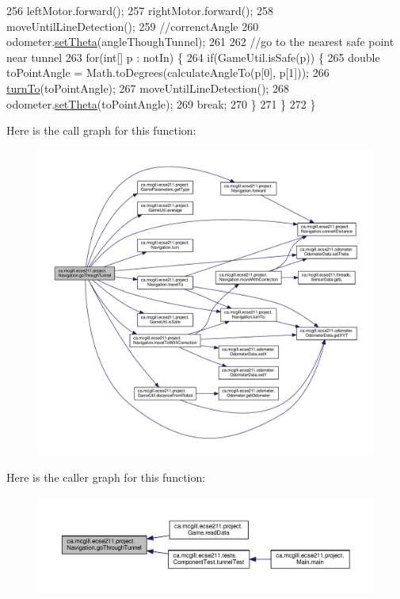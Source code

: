 \begin{DoxyCode}
256     leftMotor.forward();
257     rightMotor.forward();
258     moveUntilLineDetection();
259     \textcolor{comment}{//correnctAngle}
260     odometer.\hyperlink{classca_1_1mcgill_1_1ecse211_1_1odometer_1_1_odometer_data_a419b8f07c2c5374411c8e62298e9a402}{setTheta}(angleThoughTunnel);
261     
262     \textcolor{comment}{//go to the nearest safe point near tunnel}
263     \textcolor{keywordflow}{for}(\textcolor{keywordtype}{int}[] p : notIn) \{
264       \textcolor{keywordflow}{if}(GameUtil.isSafe(p)) \{
265         \textcolor{keywordtype}{double} toPointAngle = Math.toDegrees(calculateAngleTo(p[0], p[1]));
266         \hyperlink{classca_1_1mcgill_1_1ecse211_1_1project_1_1_navigation_a3bbe0645f2b3b3d0986b4a707fb5a00c}{turnTo}(toPointAngle);
267         moveUntilLineDetection();
268         odometer.\hyperlink{classca_1_1mcgill_1_1ecse211_1_1odometer_1_1_odometer_data_a419b8f07c2c5374411c8e62298e9a402}{setTheta}(toPointAngle);
269         \textcolor{keywordflow}{break};
270       \}
271     \}
272   \}
\end{DoxyCode}
Here is the call graph for this function\+:
\nopagebreak
\begin{figure}[H]
\begin{center}
\leavevmode
\includegraphics[width=350pt]{classca_1_1mcgill_1_1ecse211_1_1project_1_1_navigation_a4b52e605d3ea2f9bcd9481ae2c69ba39_cgraph}
\end{center}
\end{figure}
Here is the caller graph for this function\+:
\nopagebreak
\begin{figure}[H]
\begin{center}
\leavevmode
\includegraphics[width=350pt]{classca_1_1mcgill_1_1ecse211_1_1project_1_1_navigation_a4b52e605d3ea2f9bcd9481ae2c69ba39_icgraph}
\end{center}
\end{figure}
